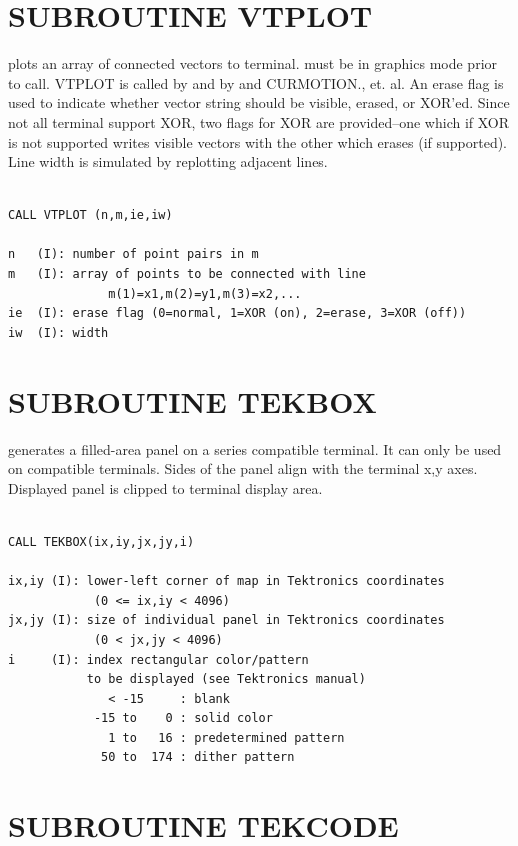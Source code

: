 \documentclass[11pt]{report}
\begin{document}
\section{SUBROUTINE VTPLOT}

 plots an array of connected vectors to terminal. 
must be in graphics mode prior to call.  VTPLOT is called by 
and by  and CURMOTION., et. al.  An erase flag is used
to indicate whether vector string should be visible, erased, or
XOR'ed.  Since not all terminal support XOR, two flags for XOR are
provided--one which if XOR is not supported writes visible  vectors
with the other which erases (if supported).  Line width is simulated
by replotting adjacent lines.
\begin{verbatim}

CALL VTPLOT (n,m,ie,iw)

n   (I): number of point pairs in m
m   (I): array of points to be connected with line
              m(1)=x1,m(2)=y1,m(3)=x2,...
ie  (I): erase flag (0=normal, 1=XOR (on), 2=erase, 3=XOR (off))
iw  (I): width
\end{verbatim}

\section{SUBROUTINE TEKBOX}

 generates a filled-area panel on a   series
compatible terminal.  It can only be used on compatible terminals.  Sides
of the panel align with the terminal x,y axes.  Displayed panel is
clipped to terminal display area.
\begin{verbatim}

CALL TEKBOX(ix,iy,jx,jy,i)

ix,iy (I): lower-left corner of map in Tektronics coordinates
            (0 <= ix,iy < 4096)
jx,jy (I): size of individual panel in Tektronics coordinates
            (0 < jx,jy < 4096)
i     (I): index rectangular color/pattern 
           to be displayed (see Tektronics manual)
              < -15     : blank
            -15 to    0 : solid color 
              1 to   16 : predetermined pattern
             50 to  174 : dither pattern
\end{verbatim}

\section{SUBROUTINE TEKCODE}
\end{document}
